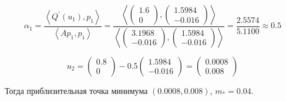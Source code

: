 \documentclass[12 pt]{article}
\begin{document}
$$\alpha_1 = \frac{\left\langle Q^{\prime}\left(u_{1}\right), p_{1}\right\rangle}{\left\langle A p_{1}, p_{1}\right\rangle}=\frac{\left\langle\left(\begin{array}{c}
	1.6 \\
	0
	\end{array}\right),\left(\begin{array}{c}
	1.5984 \\
	-0.016
	\end{array}\right)\right\rangle}{\left\langle\left(\begin{array}{c}
	3.1968 \\
	-0.016
	\end{array}\right),\left(\begin{array}{c}
	1.5984 \\
	-0.016
	\end{array}\right)\right\rangle}=\frac{2.5574}{5.1100} \approx 0.5 $$



$$u_2 = \left(\begin{array}{c}
0.8 \\
0
\end{array}\right) - 0.5 \left(\begin{array}{l}
1.5984 \\
-0.016
\end{array}\right) = \left(\begin{array}{l}
0.0008\\
0.008
\end{array}\right)$$

Тогда приблизительная точка минимума $(0.0008,0.008)$, $m_* = 0.04.$
\end{document}
